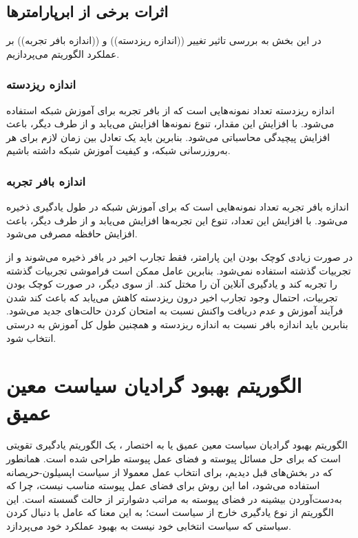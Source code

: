 \subsection{اثرات برخی از ابرپارامتر‌ها}
در این بخش به بررسی تاثیر تغییر ((اندازه ریزدسته)) و ((اندازه بافر تجربه)) بر عملکرد الگوریتم  می‌پردازیم.
\subsubsection{اندازه ریزدسته}
اندازه ریزدسته تعداد نمونه‌هایی است که از بافر تجربه برای آموزش شبکه استفاده می‌شود.
با افزایش این مقدار، تنوع نمونه‌ها افزایش می‌یابد و از طرف دیگر، باعث افزایش پیچیدگی محاسباتی می‌شود.
بنابرین باید یک تعادل بین زمان لازم برای هر به‌روز‌رسانی شبکه، و کیفیت آموزش شبکه داشته باشیم.
\subsubsection{اندازه بافر تجربه}
اندازه بافر تجربه تعداد نمونه‌هایی است که برای آموزش شبکه در طول یادگیری ذخیره می‌شود.
با افزایش این تعداد، تنوع این تجربه‌ها افزایش می‌یابد و از طرف دیگر، باعث افزایش حافظه مصرفی می‌شود.

در صورت زیادی کوچک بودن این پارامتر، فقط تجارب اخیر در بافر ذخیره می‌شوند و از تجربیات گذشته استفاده نمی‌شود.
بنابرین عامل ممکن است فراموشی تجربیات گذشته را تجربه کند و یادگیری آنلاین آن را مختل کند.
از سوی دیگر، در صورت کوچک بودن تجربیات، احتمال وجود تجارب اخیر درون ریزدسته کاهش می‌یابد که باعث کند شدن فرآیند آموزش و عدم دریافت واکنش نسبت به امتحان کردن حالت‌های جدید می‌شود.
بنابرین باید اندازه بافر نسبت به اندازه ریزدسته و همچنین طول کل آموزش به درستی انتخاب شود.  
\section{الگوریتم بهبود گرادیان سیاست معین عمیق}
الگوریتم بهبود گرادیان سیاست معین عمیق  یا به اختصار ، یک الگوریتم یادگیری تقویتی است که برای حل مسائل پیوسته و فضای عمل پیوسته طراحی شده است.
همانطور که در بخش‌های قبل دیدیم، برای انتخاب عمل معمولا از سیاست اپسیلون-حریصانه استفاده می‌شود، اما این روش برای فضای عمل پیوسته مناسب نیست، چرا که به‌دست‌آوردن بیشینه در فضای پیوسته به مراتب دشوار‌تر از حالت گسسته است.
این الگوریتم از نوع یادگیری خارج از سیاست است؛ به این معنا که عامل با دنبال کردن سیاستی که سیاست انتخابی خود نیست به بهبود عملکرد خود می‌پردازد.

